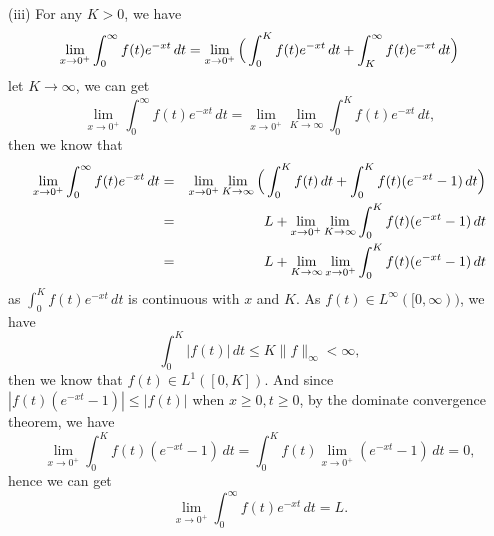 \documentclass[12pt,a4paper]{ctexart}
\begin{document}
(iii) For any $K > 0$, we have
\begin{equation*}
    \lim_{x \to 0^{+}} \int_{0}^{ \infty} f(t) e^{- x t} \, d t =  \lim_{x \to 0^{+}} \Big{(} \int_{0}^{K} f(t) e^{- x t} \, d t + \int_{K}^{\infty} f(t) e^{- x t} \, d t \Big{)}
\end{equation*}
let $K \to \infty$, we can get 
\begin{equation*}
    \lim_{x \to 0^{+}} \int_{0}^{ \infty} f(t) e^{- x t} \, d t  =  \lim_{x \to 0^{+}} \lim_{K \to \infty} \int_{0}^{K} f(t) e^{- x t} \, d t, 
\end{equation*}
then we know that 
\begin{eqnarray*}
\lim_{x \to 0^{+}} \int_{0}^{ \infty} f(t) e^{- x t} \, d t 
& = & \lim_{x \to 0^{+}} \lim_{K \to \infty} \Big{(} \int_{0}^{K} f(t) \, d t + \int_{0}^{K} f(t) ( e^{- x t} - 1) \, d t \Big{)} \\
& = & L + \lim_{x \to 0^{+}} \lim_{K \to \infty}  \int_{0}^{K} f(t) ( e^{- x t} - 1) \, d t \\
& = & L + \lim_{K \to \infty} \lim_{x \to 0^{+}} \int_{0}^{K} f(t) ( e^{- x t} - 1) \, d t
\end{eqnarray*}
as $\int_{0}^{K} f(t) e^{- x t} \, d t$ is continuous with $x$ and $K$. As $f(t) \in L^{\infty}([0, \infty))$, we have
\begin{equation*}
    \int_{0}^{K} |f(t)| \, d t \leq K \|f\|_{\infty} < \infty,
\end{equation*}
then we know that $f(t) \in L^{1}([0, K])$. And since $|f(t) ( e^{- x t} - 1)| \leq |f(t)|$ when $x \geq 0, t \geq 0$, by the dominate convergence theorem, we have
\begin{equation*}
    \lim_{x \to 0^{+}} \int_{0}^{K} f(t) (e^{-x t} - 1) \, d t = \int_{0}^{K} f(t) \lim_{x \to 0^{+}} (e^{-x t} - 1) \, d t = 0,
\end{equation*}
hence we can get
\begin{equation*}
    \lim_{x \to 0^{+}} \int_{0}^{ \infty} f(t) e^{- x t} \, d t = L.
\end{equation*}
\end{document}
